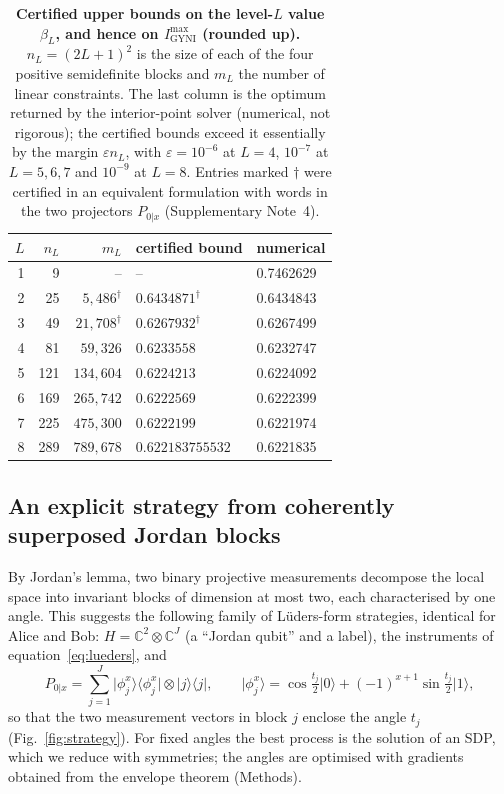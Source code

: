 \documentclass[11pt]{article}
\newcommand{\ket}[1]{\lvert #1\rangle}
\newcommand{\bra}[1]{\langle #1\rvert}
\newcommand{\CC}{\mathbb{C}}
\newcommand{\Imax}{I_{\mathrm{GYNI}}^{\max}}
\begin{document}
\begin{table}[t]
\centering
\caption{\textbf{Certified upper bounds on the level-$L$ value $\beta_L$, and hence on $\Imax$ (rounded up).} $n_L=(2L+1)^2$ is the size of each of the four positive semidefinite blocks and $m_L$ the number of linear constraints. The last column is the optimum returned by the interior-point solver (numerical, not rigorous); the certified bounds exceed it essentially by the margin $\varepsilon n_L$, with $\varepsilon=10^{-6}$ at $L=4$, $10^{-7}$ at $L=5,6,7$ and $10^{-9}$ at $L=8$. Entries marked $\dagger$ were certified in an equivalent formulation with words in the two projectors $P_{0|x}$ (Supplementary Note~4).}
\label{tab:levels}
\begin{tabular}{rrrll}
\toprule
$L$ & $n_L$ & $m_L$ & certified bound & numerical\\
\midrule
1 & 9   & --                    & --                          & 0.7462629\\
2 & 25  & $5{,}486^\dagger$     & $0.6434871^\dagger$         & 0.6434843\\
3 & 49  & $21{,}708^\dagger$    & $0.6267932^\dagger$         & 0.6267499\\
4 & 81  & $59{,}326$            & $0.6233558$                 & 0.6232747\\
5 & 121 & $134{,}604$           & $0.6224213$                 & 0.6224092\\
6 & 169 & $265{,}742$           & $0.6222569$                 & 0.6222399\\
7 & 225 & $475{,}300$           & $0.6222199$                 & 0.6221974\\
8 & 289 & $789{,}678$           & $\mathbf{0.622183755532}$   & 0.6221835\\
\bottomrule
\end{tabular}
\end{table}

\subsection*{An explicit strategy from coherently superposed Jordan blocks}
By Jordan's lemma\cite{Pironio2009}, two binary projective measurements decompose the local space into invariant blocks of dimension at most two, each characterised by one angle. This suggests the following family of L\"uders-form strategies, identical for Alice and Bob: $H=\CC^2\otimes\CC^J$ (a ``Jordan qubit'' and a label), the instruments of equation~\eqref{eq:lueders}, and
\begin{equation}
P_{0|x}=\sum_{j=1}^J\ket{\phi_j^x}\bra{\phi_j^x}\otimes\ket{j}\bra{j},\qquad
\ket{\phi_j^x}=\cos\tfrac{t_j}{2}\ket{0}+(-1)^{x+1}\sin\tfrac{t_j}{2}\ket{1},
\label{eq:jordan}
\end{equation}
so that the two measurement vectors in block $j$ enclose the angle $t_j$ (Fig.~\ref{fig:strategy}). For fixed angles the best process is the solution of an SDP, which we reduce with symmetries; the angles are optimised with gradients obtained from the envelope theorem (Methods).
\end{document}
